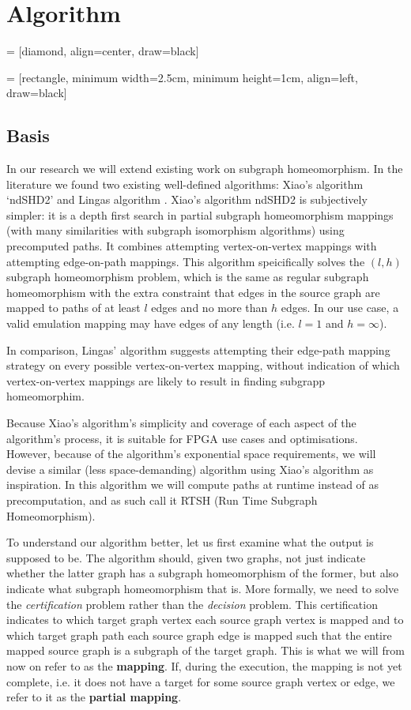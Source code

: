 \chapter{Algorithm}
\label{chapter:algorithm}

 = [diamond, align=center, draw=black]

 = [rectangle, minimum width=2.5cm, minimum height=1cm, align=left, draw=black]


\section{Basis}
In our research we will extend existing work on subgraph homeomorphism. In the literature we found two existing well-defined algorithms: Xiao's algorithm `ndSHD2' \cite{XIAONODEDISJOINT} and Lingas algorithm \cite{LINGAS2009464}. Xiao's algorithm ndSHD2 is subjectively simpler: it is a depth first search in partial subgraph homeomorphism mappings (with many similarities with subgraph isomorphism algorithms) using precomputed paths. It combines attempting vertex-on-vertex mappings with attempting edge-on-path mappings. This algorithm speicifically solves the $(l,h)$ subgraph homeomorphism problem, which is the same as regular subgraph homeomorphism with the extra constraint that edges in the source graph are mapped to paths of at least $l$ edges and no more than $h$ edges. In our use case, a valid emulation mapping may have edges of any length (i.e. $l=1$ and $h=\infty$). 

In comparison, Lingas' algorithm suggests attempting their edge-path mapping strategy on every possible vertex-on-vertex mapping, without indication of which vertex-on-vertex mappings are likely to result in finding subgrapp homeomorphim.

Because Xiao's algorithm's simplicity and coverage of each aspect of the algorithm's process, it is suitable for FPGA use cases and optimisations. However, because of the algorithm's exponential space requirements, we will devise a similar (less space-demanding) algorithm using Xiao's algorithm as inspiration. In this algorithm we will compute paths at runtime instead of as precomputation, and as such call it RTSH (Run Time Subgraph Homeomorphism).

To understand our algorithm better, let us first examine what the output is supposed to be. The algorithm should, given two graphs, not just indicate whether the latter graph has a subgraph homeomorphism of the former, but also indicate what subgraph homeomorphism that is. More formally, we need to solve the \textit{certification} problem rather than the \textit{decision} problem. This certification indicates to which target graph vertex each source graph vertex is mapped and to which target graph path each source graph edge is mapped such that the entire mapped source graph is a subgraph of the target graph. This is what we will from now on refer to as the \textbf{mapping}. If, during the execution, the mapping is not yet complete, i.e. it does not have a target for some source graph vertex or edge, we refer to it as the \textbf{partial mapping}.

